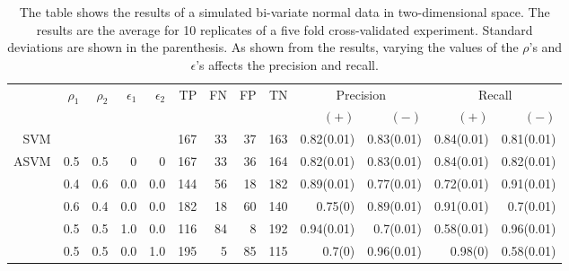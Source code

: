 \documentclass[twoside,11pt]{article}
\begin{document}
\begin{table}[htp]\label{simulatedsvmtable}

    \tiny\begin{tabular}{rrrrr|rrrrrrrr}
    \hline
    &\multirow{2}{*}{$\rho_1$} & \multirow{2}{*}{$\rho_2$} & \multirow{2}{*}{$\epsilon_1$} & \multirow{2}{*}{$\epsilon_2$} & \multirow{2}{*}{TP}    & \multirow{2}{*}{FN}    & \multirow{2}{*}{FP}    & \multirow{2}{*}{TN} & \multicolumn{2}{c}{Precision} & \multicolumn{2}{c}{Recall}\\
    &&&&&&&&&  $(+)$ &  $(-)$ &  $(+)$ &  $(-)$ \bigstrut\\

\hline
\hline
SVM &       &       &       &       & 167   & 33    & 37    & 163   & 0.82(0.01) & 0.83(0.01) & 0.84(0.01) & 0.81(0.01) \bigstrut\\
\hline
\multirow{2}{*}{ASVM} & 0.5   & 0.5   & 0     & 0     & 167   & 33    & 36    & 164   & 0.82(0.01) & 0.83(0.01) & 0.84(0.01) & 0.82(0.01) \bigstrut[t]\\
      & 0.4   & 0.6   & 0.0   & 0.0   & 144   & 56    & 18    & 182   & 0.89(0.01) & 0.77(0.01) & 0.72(0.01) & 0.91(0.01) \\
      & 0.6   & 0.4   & 0.0   & 0.0   & 182   & 18    & 60    & 140   & 0.75(0) & 0.89(0.01) & 0.91(0.01) & 0.7(0.01) \\
      & 0.5   & 0.5   & 1.0   & 0.0   & 116   & 84    & 8     & 192   & 0.94(0.01) & 0.7(0.01) & 0.58(0.01) & 0.96(0.01) \\
      & 0.5   & 0.5   & 0.0   & 1.0   & 195   & 5     & 85    & 115   & 0.7(0) & 0.96(0.01) & 0.98(0) & 0.58(0.01) \bigstrut[b]\\
\hline
\hline
\end{tabular}
\caption{The table shows the results of a simulated bi-variate normal data in two-dimensional space. The results are the average for 10 replicates of a five fold cross-validated experiment. Standard deviations are shown in the parenthesis. As shown from the results, varying the values of the $\rho$'s and $\epsilon$'s affects the precision and recall.}
\end{table}
\end{document}
